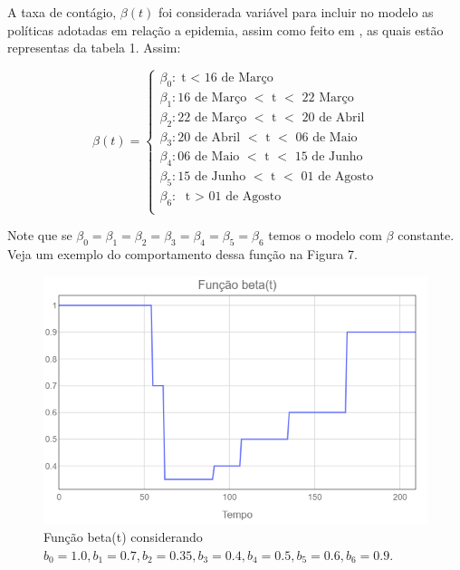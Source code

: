 \documentclass[12pt]{article}
\begin{document}
A taxa de contágio, $\beta(t)$ foi considerada variável para incluir no modelo as políticas adotadas em relação a epidemia, assim como feito em \cite{goetz2020covid}, as quais estão representas da tabela 1. Assim:

\begin{center}
$$
\beta(t) = 
\begin{cases}
\beta_0 : \text{t $<$ 16 de Março} \\
\beta_1 : \text{16 de Março $<$ t $<$ 22 Março} \\
\beta_2 : \text{22 de Março $<$ t $<$ 20 de Abril}\\
\beta_3 : \text{20 de Abril $<$ t $<$ 06 de Maio} \\
\beta_4 : \text{06 de Maio $<$ t $<$ 15 de Junho} \\
\beta_5 : \text{15 de Junho $<$ t $<$ 01 de Agosto}\\
\beta_6: \text{ t $>$ 01 de Agosto}\\
\end{cases}
$$
\end{center}

\noindent Note que se $\beta_0 = \beta_1 = \beta_2 =\beta_3 =\beta_4 =
\beta_5 = \beta_6$ temos o modelo com $\beta$ constante. Veja um exemplo do comportamento dessa função na Figura 7.

\begin{figure}[h]
\begin{center}
    \includegraphics[scale = 0.5]{beta(t).png}
    \caption{Função beta(t) considerando $b_0 = 1.0, b_1 = 0.7, b_2 = 0.35, b_3 = 0.4, b_4 = 0.5, b_5 = 0.6, b_6 = 0.9$.}
\end{center}
\end{figure}
\end{document}
